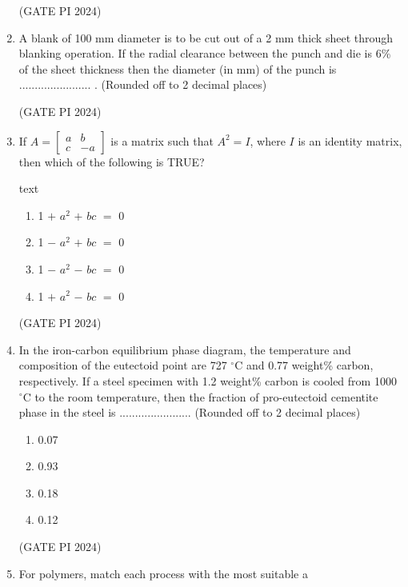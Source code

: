 \documentclass[journal,12pt,onecolumn]{IEEEtran}
\theoremstyle{remark}
\begin{document}
\begin{enumerate}
\hfill (GATE PI 2024)

\item A blank of 100 mm diameter is to be cut out of a 2 mm thick sheet through blanking operation. If the radial clearance between the punch and die is 6\% of the sheet thickness then the diameter (in mm) of the punch is ....................... . (Rounded off to 2 decimal places)

\hfill (GATE PI 2024)

\item If $A=\begin{bmatrix} a & b \\ c & -a \end{bmatrix}$ is a matrix such that $A^2=I$, where $I$ is an identity matrix, then which of the following is TRUE?

text
\begin{enumerate}
    \item 1 $+$ $a^2$ $+$ $bc$ $=$ 0
    \item 1 $-$ $a^2$ $+$ $bc$ $=$ 0
    \item 1 $-$ $a^2$ $-$ $bc$ $=$ 0
    \item 1 $+$ $a^2$ $-$ $bc$ $=$ 0
\end{enumerate}

\hfill (GATE PI 2024)

\item In the iron-carbon equilibrium phase diagram, the temperature and composition of the eutectoid point are 727 $^\circ$C and 0.77 weight\% carbon, respectively. If a steel specimen with 1.2 weight\% carbon is cooled from 1000 $^\circ$C to the room temperature, then the fraction of pro-eutectoid cementite phase in the steel is ....................... (Rounded off to 2 decimal places)

\begin{multicols}{4}
\begin{enumerate}
    \item 0.07
    \item 0.93
    \item 0.18
    \item 0.12
\end{enumerate}
\end{multicols}

\hfill (GATE PI 2024)

\item For polymers, match each process with the most suitable a




\end{enumerate}
\end{document}
